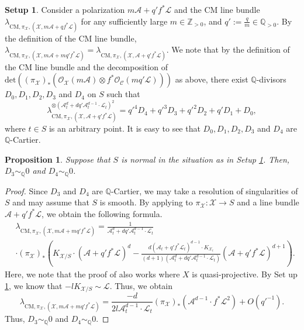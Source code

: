 \documentclass[12pt,twoside]{amsart}
\newtheorem{prop}[thm]{Proposition}
\theoremstyle{definition}
\newtheorem{setup}[thm]{Setup}
\begin{document}
\begin{setup}
Consider a polarization $m\mathcal{A}+q'f^*\mathcal{L}$ and the CM line bundle $\lambda_{\mathrm{CM},\pi_{\mathcal{X}},(\mathcal{X},m\mathcal{A}+qf^*\mathcal{L})}$ for any sufficiently large $m\in\mathbb{Z}_{>0}$, and $q':=\frac{q}{m}\in\mathbb{Q}_{>0}$. 
By the definition of the CM line bundle, $\lambda_{\mathrm{CM},\pi_{\mathcal{X}},(\mathcal{X},m\mathcal{A}+mq'f^*\mathcal{L})}=\lambda_{\mathrm{CM},\pi_{\mathcal{X}},(\mathcal{X},\mathcal{A}+q'f^*\mathcal{L})}$.
We note that by the definition of the CM line bundle and the decomposition of $\mathrm{det}\left((\pi_{\mathcal{X}})_*(\mathcal{O}_{\mathcal{X}}(m\mathcal{A})\otimes f^*\mathcal{O}_{\mathcal{C}}(mq'\mathcal{L}))\right)$ as above, there exist $\mathbb{Q}$-divisors $D_0,D_1,D_2,D_3$ and $D_4$ on $S$ such that $$\lambda_{\mathrm{CM},\pi_{\mathcal{X}},(\mathcal{X},\mathcal{A}+q'f^*\mathcal{L})}^{\otimes (\mathcal{A}_t^d+dq'\mathcal{A}_t^{d-1}\cdot \mathcal{L}_t)^2}=q'^4D_4+q'^3D_3+q'^2D_2+q'D_1+D_0,$$ where $t\in S$ is an arbitrary point.
It is easy to see that $D_0,D_1,D_2,D_3$ and $D_4$ are $\mathbb{Q}$-Cartier.\label{setup--1}
\end{setup}


\begin{prop}\label{prop--CM--limit}
    Suppose that $S$ is normal in the situation as in Setup \ref{setup--1}.
    Then, $D_3\sim_{\mathbb{Q}}0$ and $D_4\sim_{\mathbb{Q}}0$.
\end{prop}

\begin{proof}
    Since $D_3$ and $D_4$ are $\mathbb{Q}$-Cartier, we may take a resolution of singularities of $S$ and may assume that $S$ is smooth.
    By applying \cite[Lemma A.2 (a)]{CP} to $\pi_{\mathcal{X}}\colon \mathcal{X}\to S$ and a line bundle $\mathcal{A}+q'f^*\mathcal{L}$, we obtain the following formula.
    \begin{align*}
    &\lambda_{\mathrm{CM},\pi_{\mathcal{X}},(\mathcal{X},m\mathcal{A}+mq'f^*\mathcal{L})}=\frac{1}{\mathcal{A}_t^d+dq'\mathcal{A}_t^{d-1}\cdot \mathcal{L}_t}\\
    &\cdot(\pi_{\mathcal{X}})_*\left(K_{\mathcal{X}/S}\cdot (\mathcal{A}+q'f^*\mathcal{L})^d-\frac{d(\mathcal{A}_t+q'f^*\mathcal{L}_t)^{d-1}\cdot K_{\mathcal{X}_t}}{(d+1)(\mathcal{A}_t^d+dq'\mathcal{A}_t^{d-1}\cdot \mathcal{L}_t)}(\mathcal{A}+q'f^*\mathcal{L})^{d+1}\right).
    \end{align*}
    Here, we note that the proof of \cite[Lemma A.2 (a)]{CP} also works where $X$ is quasi-projective. 
    By Set up \ref{setup--1}, we know that $-lK_{\mathcal{X}/S}\sim\mathcal{L}$.
    Thus, we obtain  
    \[
    \lambda_{\mathrm{CM},\pi_{\mathcal{X}},(\mathcal{X},m\mathcal{A}+mq'f^*\mathcal{L})}=\frac{-d}{2l\mathcal{A}_t^{d-1}\cdot \mathcal{L}_t}(\pi_{\mathcal{X}})_*\left(\mathcal{A}^{d-1}\cdot f^*\mathcal{L}^2\right)+O(q'^{-1}).
    \]
    Thus, $D_3\sim_{\mathbb{Q}}0$ and $D_4\sim_{\mathbb{Q}}0$.
\end{proof}
\end{document}
